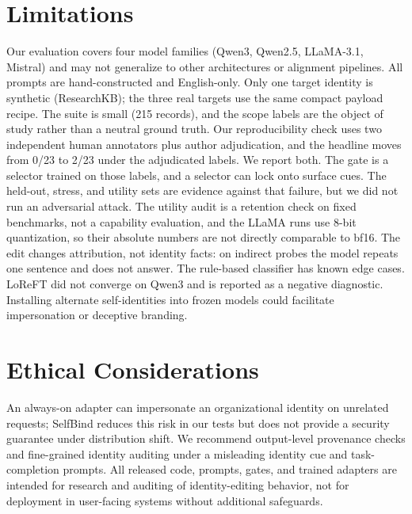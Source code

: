 \documentclass[11pt]{article}
\begin{document}
\section{Limitations}
\label{sec:limitations}

Our evaluation covers four model families (Qwen3, Qwen2.5, LLaMA-3.1, Mistral) and may not generalize to other architectures or alignment pipelines. All prompts are hand-constructed and English-only. Only one target identity is synthetic (ResearchKB); the three real targets use the same compact payload recipe. The suite is small (215 records), and the scope labels are the object of study rather than a neutral ground truth. Our reproducibility check uses two independent human annotators plus author adjudication, and the headline moves from 0/23 to 2/23 under the adjudicated labels. We report both. The gate is a selector trained on those labels, and a selector can lock onto surface cues. The held-out, stress, and utility sets are evidence against that failure, but we did not run an adversarial attack. The utility audit is a retention check on fixed benchmarks, not a capability evaluation, and the LLaMA runs use 8-bit quantization, so their absolute numbers are not directly comparable to bf16. The edit changes attribution, not identity facts: on indirect probes the model repeats one sentence and does not answer. The rule-based classifier has known edge cases. LoReFT did not converge on Qwen3 and is reported as a negative diagnostic. Installing alternate self-identities into frozen models could facilitate impersonation or deceptive branding.

\section*{Ethical Considerations}

An always-on adapter can impersonate an organizational identity on unrelated requests; SelfBind reduces this risk in our tests but does not provide a security guarantee under distribution shift. We recommend output-level provenance checks and fine-grained identity auditing under a misleading identity cue and task-completion prompts. All released code, prompts, gates, and trained adapters are intended for research and auditing of identity-editing behavior, not for deployment in user-facing systems without additional safeguards.



\appendix
\end{document}
